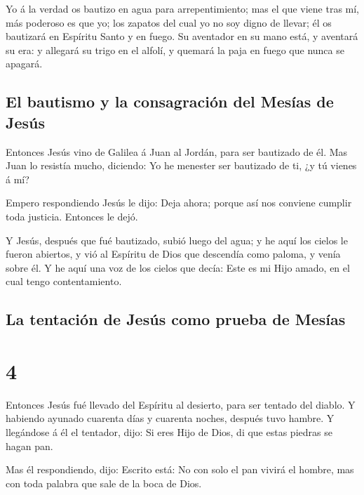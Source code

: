  Yo á la verdad os bautizo en agua para arrepentimiento;
mas el que viene tras mí, más poderoso es que yo; los zapatos del cual
yo no soy digno de llevar; él os bautizará en Espíritu Santo y en fuego.
 Su aventador en su mano está, y aventará su era: y
allegará su trigo en el alfolí, y quemará la paja en fuego que nunca se
apagará.

\hypertarget{el-bautismo-y-la-consagraciuxf3n-del-mesuxedas-de-jesuxfas}{%
\subsection{El bautismo y la consagración del Mesías de
Jesús}\label{el-bautismo-y-la-consagraciuxf3n-del-mesuxedas-de-jesuxfas}}

 Entonces Jesús vino de Galilea á Juan al Jordán, para ser
bautizado de él.  Mas Juan lo resistía mucho, diciendo: Yo
he menester ser bautizado de ti, ¿y tú vienes á mí?

 Empero respondiendo Jesús le dijo: Deja ahora; porque así
nos conviene cumplir toda justicia. Entonces le dejó.

 Y Jesús, después que fué bautizado, subió luego del agua;
y he aquí los cielos le fueron abiertos, y vió al Espíritu de Dios que
descendía como paloma, y venía sobre él.  Y he aquí una voz
de los cielos que decía: Este es mi Hijo amado, en el cual tengo
contentamiento.

\hypertarget{la-tentaciuxf3n-de-jesuxfas-como-prueba-de-mesuxedas}{%
\subsection{La tentación de Jesús como prueba de
Mesías}\label{la-tentaciuxf3n-de-jesuxfas-como-prueba-de-mesuxedas}}

\hypertarget{section-3}{%
\section{4}\label{section-3}}

 Entonces Jesús fué llevado del Espíritu al desierto, para
ser tentado del diablo.  Y habiendo ayunado cuarenta días y
cuarenta noches, después tuvo hambre.  Y llegándose á él el
tentador, dijo: Si eres Hijo de Dios, di que estas piedras se hagan pan.

 Mas él respondiendo, dijo: Escrito está: No con solo el pan
vivirá el hombre, mas con toda palabra que sale de la boca de Dios.

